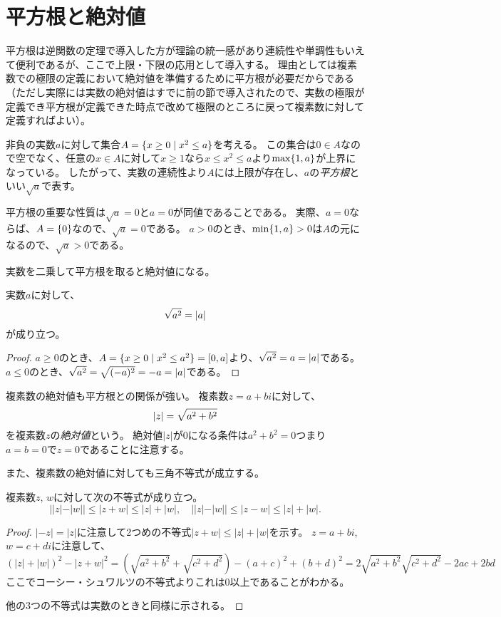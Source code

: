\section{平方根と絶対値}

平方根は逆関数の定理で導入した方が理論の統一感があり連続性や単調性もいえて便利であるが、ここで上限・下限の応用として導入する。
理由としては複素数での極限の定義において絶対値を準備するために平方根が必要だからである（ただし実際には実数の絶対値はすでに前の節で導入されたので、実数の極限が定義でき平方根が定義できた時点で改めて極限のところに戻って複素数に対して定義すればよい）。

非負の実数$a$に対して集合$A = \{ x \ge 0 \mid x^2 \le a \}$を考える。
この集合は$0 \in A$なので空でなく、任意の$x \in A$に対して$x \ge 1$なら$x \le x^2 \le a$より$\max\{ 1, a \}$が上界になっている。
したがって、実数の連続性より$A$には上限が存在し、$a$の\emph{平方根}といい$\sqrt{a}$で表す。

平方根の重要な性質は$\sqrt{a} = 0$と$a = 0$が同値であることである。
実際、$a = 0$ならば、$A = \{ 0 \}$なので、$\sqrt{a} = 0$である。
$a > 0$のとき、$\min\{ 1, a \} > 0$は$A$の元になるので、$\sqrt{a} > 0$である。

実数を二乗して平方根を取ると絶対値になる。

\begin{proposition}[平方根と実数の絶対値]
実数$a$に対して、
$$
\sqrt{a^2} = \abs{a}
$$
が成り立つ。
\end{proposition}

\begin{proof}
$a \ge 0$のとき、$A = \{ x \ge 0 \mid x^2 \le a^2 \} = [0, a]$より、$\sqrt{a^2} = a = \abs{a}$である。
$a \le 0$のとき、$\sqrt{a^2} = \sqrt{(-a)^2} = -a = \abs{a}$である。
\end{proof}

複素数の絶対値も平方根との関係が強い。
複素数$z = a+b i$に対して、
$$
\abs{z} = \sqrt{a^2+b^2}
$$
を複素数$z$の\emph{絶対値}という。
絶対値$|z|$が$0$になる条件は$a^2+b^2 = 0$つまり$a = b = 0$で$z = 0$であることに注意する。

また、複素数の絶対値に対しても三角不等式が成立する。

\begin{proposition}[複素数の絶対値の三角不等式]
複素数$z$, $w$に対して次の不等式が成り立つ。
$$
||z|-|w|| \le |z+w| \le |z|+|w|,
\quad ||z|-|w|| \le |z-w| \le |z|+|w|.
$$
\end{proposition}

\begin{proof}
$|-z| = |z|$に注意して2つめの不等式$|z+w| \le |z|+|w|$を示す。
$z = a+b i$, $w = c+d i$に注意して、
$$
(|z|+|w|)^2-|z+w|^2
= (\sqrt{a^2+b^2}+\sqrt{c^2+d^2})-(a+c)^2+(b+d)^2
= 2\sqrt{a^2+b^2}\sqrt{c^2+d^2}-2 a c+2 b d
$$
ここでコーシー・シュワルツの不等式よりこれは$0$以上であることがわかる。

他の3つの不等式は実数のときと同様に示される。
\end{proof}
